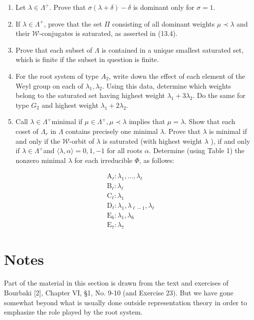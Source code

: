 \documentclass[10pt]{article}
\begin{document}
\begin{enumerate}
  \item Let $\lambda \in \Lambda^{+}$. Prove that $\sigma(\lambda+\delta)-\delta$ is dominant only for $\sigma=1$.
  \item If $\lambda \in \Lambda^{+}$, prove that the set $\Pi$ consisting of all dominant weights $\mu \prec \lambda$ and their $\mathscr{W}$-conjugates is saturated, as asserted in (13.4).
  \item Prove that each subset of $\Lambda$ is contained in a unique smallest saturated set, which is finite if the subset in question is finite.
  \item For the root system of type $A_{2}$, write down the effect of each element of the Weyl group on each of $\lambda_{1}, \lambda_{2}$. Using this data, determine which weights belong to the saturated set having highest weight $\lambda_{1}+3 \lambda_{2}$. Do the same for type $G_{2}$ and highest weight $\lambda_{1}+2 \lambda_{2}$.
  \item Call $\lambda \in \Lambda^{+}$minimal if $\mu \in \Lambda^{+}, \mu \prec \lambda$ implies that $\mu=\lambda$. Show that each coset of $\Lambda_{r}$ in $\Lambda$ contains precisely one minimal $\lambda$. Prove that $\lambda$ is minimal if and only if the $\mathscr{W}$-orbit of $\lambda$ is saturated (with highest weight $\lambda$ ), if and only if $\lambda \in \Lambda^{+}$and $\langle\lambda, \alpha\rangle=0,1,-1$ for all roots $\alpha$. Determine (using Table 1) the nonzero minimal $\lambda$ for each irreducible $\Phi$, as follows:
\end{enumerate}

$$
\begin{aligned}
& \mathrm{A}_{\ell}: \lambda_{1}, \ldots, \lambda_{\ell} \\
& \mathrm{B}_{\ell}: \lambda_{\ell} \\
& \mathrm{C}_{\ell}: \lambda_{1} \\
& \mathrm{D}_{\ell}: \lambda_{1}, \lambda_{\ell-1}, \lambda_{\ell} \\
& \mathrm{E}_{6}: \lambda_{1}, \lambda_{6} \\
& \mathrm{E}_{7}: \lambda_{7}
\end{aligned}
$$

\section*{Notes}
Part of the material in this section is drawn from the text and exercises of Bourbaki [2], Chapter VI, §1, No. 9-10 (and Exercise 23). But we have gone somewhat beyond what is usually done outside representation theory in order to emphasize the role played by the root system.
\end{document}
